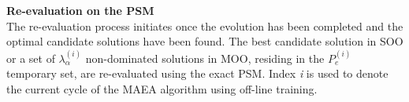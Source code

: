 \begin{OFFL}
\newpage


\item \textbf{Re-evaluation on the PSM}\\
The re-evaluation process initiates once the evolution 
has been completed and the optimal candidate solutions have 
been found. The best candidate solution in SOO or a set of 
$λ_{α}^{(i)}$ non-dominated solutions in MOO, residing in the 
$P_{e}^{(i)}$ temporary set, are re-evaluated using the exact PSM. 
Index \textit{i} is used to denote the current cycle of the MAEA 
algorithm using off-line training. 


\end{OFFL}
